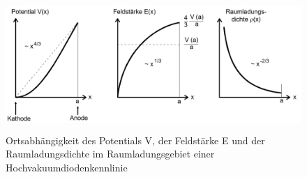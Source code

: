 \begin{figure}
    \centering
    \includegraphics[height=5.0cm]{data/abb4.jpg}
    \caption{Ortsabhängigkeit des Potentials V, der Feldstärke E und der Raumladungsdichte \rho im Raumladungsgebiet einer Hochvakuumdiodenkennlinie \cite{V504}}
    \label{fig:abb4}
\end{figure} \\
\noindent

